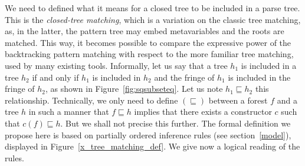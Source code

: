 We need to defined what it means for a closed tree to be included in a
parse tree. This is the \emph{closed\hyp{}tree matching}, which is a
variation on the classic tree matching, as, in the latter, the pattern
tree may embed meta\-variables and the roots are matched. This way, it
becomes possible to compare the expressive power of the backtracking
pattern matching with respect to the more familiar tree matching, used
by many existing tools. Informally, let us say that a tree \(h_1\) is
included in a tree \(h_2\) if and only if \(h_1\) is included in
\(h_2\) and the fringe of \(h_1\) is included in the fringe of
\(h_2\), as shown in Figure~\ref{fig:sqsubseteq}. Let us note \(h_1
\sqsubseteq h_2\) this relationship. Technically, we only need to
define \((\sqsubseteq)\) between a forest \(f\) and a tree \(h\) in
such a manner that \(f \sqsubseteq h\) implies that there exists a
constructor \(c\) such that \(c(f) \sqsubseteq h\). But we shall not
precise this further. The formal definition we propose here is based
on partially ordered inference rules (see section~\ref{model}),
displayed in Figure~\ref{x_tree_matching_def}. We give now a logical
reading of the rules.

